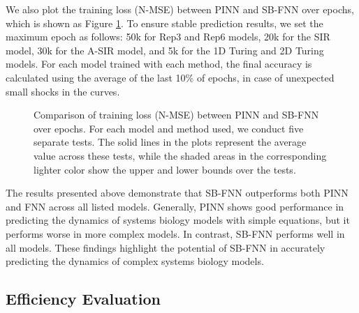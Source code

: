 We also plot the training loss (N-MSE) between PINN and SB-FNN over epochs, which is shown as Figure \ref{fig:pinn_vs_sb_fnn_nmse}. To ensure stable prediction results, we set the maximum epoch as follows: 50k for Rep3 and Rep6 models, 20k for the SIR model, 30k for the A-SIR model, and 5k for the 1D Turing and 2D Turing models. For each model trained with each method, the final accuracy is calculated using the average of the last 10\% of epochs, in case of unexpected small shocks in the curves.

\begin{figure}
    \centering
    \caption[Comparison of training loss (N-MSE) between PINN and SB-FNN over epochs] {Comparison of training loss (N-MSE) between PINN and SB-FNN over epochs. For each model and method used, we conduct five separate tests. The solid lines in the plots represent the average value across these tests, while the shaded areas in the corresponding lighter color show the upper and lower bounds over the tests.}
    \label{fig:pinn_vs_sb_fnn_nmse}
\end{figure}

The results presented above demonstrate that SB-FNN outperforms both PINN and FNN across all listed models. Generally, PINN shows good performance in predicting the dynamics of systems biology models with simple equations, but it performs worse in more complex models. In contrast, SB-FNN performs well in all models. These findings highlight the potential of SB-FNN in accurately predicting the dynamics of complex systems biology models.

\subsection{Efficiency Evaluation}

